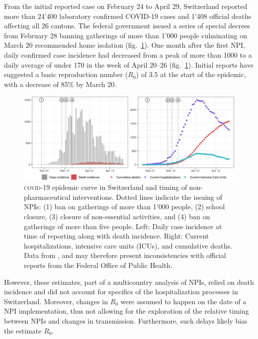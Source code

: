 From the initial reported case on February 24 to April 29, Switzerland reported more than 24'400 laboratory confirmed COVID-19 cases and 1'408 official deaths affecting all 26 cantons\cite{OFSP:RapportSituationEpidemiologique:2020}. The federal government issued a series of special decrees from February 28 banning gatherings of more than 1'000 people culminating on March 20 recommended home isolation (fig.~\ref{fig:covid-ch-data}). One month after the first NPI, daily confirmed case incidence had decreased from a peak of more than 1000 to a daily average of under 170 in the week of April 20–26 (fig.~\ref{fig:covid-ch-data}). Initial reports have suggested a basic reproduction number ($R_0$) of 3.5 at the start of the epidemic, with a decrease of 85\% by March 20\cite[-3\baselineskip]{Flaxman:Report13Estimating:2020}.
\begin{figure}\centering
  \includegraphics[width=\textwidth]{fig_covid-switzerland-npi/FIGURE_1.png}
  \caption[\textsc{covid}-19 epidemic curve in Switzerland and timing of interventions]{\textsc{covid}-19 epidemic curve in Switzerland and timing of non-pharmaceutical interventions. Dotted lines indicate the issuing of NPIs: (1) ban on gatherings of more than 1'000 people, (2) school closure, (3) closure of non-essential activities, and (4) ban on gatherings of more than five people. Left: Daily case incidence at time of reporting along with death incidence. Right: Current hospitalizations, intensive care units (ICUs), and cumulative deaths. Data from \textcite{Probst:DaenuprobstCovid19casesswitzerland:2020}, and may therefore present inconsistencies with official reports from the Federal Office of Public Health.%
  }
  \label{fig:covid-ch-data}
\end{figure}
 However, these estimates, part of a multicountry analysis of NPIs, relied on death incidence and did not account for specifics of the hospitalization processes in Switzerland. Moreover, changes in $R_0$ were assumed to happen on the date of a NPI implementation, thus not allowing for the exploration of the relative timing between NPIs and changes in transmission. Furthermore, such delays likely bias the estimate $R_0$. 

